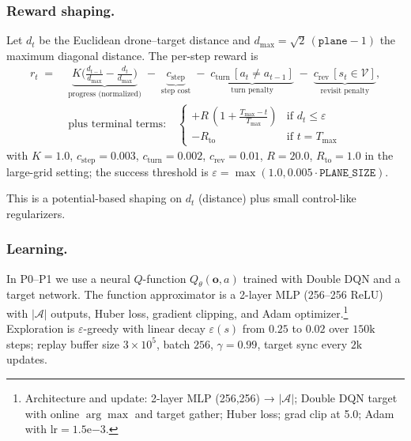         \subsubsection{Reward shaping.}
            Let $d_t$ be the Euclidean drone–target distance and $d_{\max}=\sqrt{2}\,(\texttt{plane}-1)$ the maximum diagonal distance. The per-step reward is
            \begin{align}
                r_t \;=\; &\underbrace{K \big(\tfrac{d_{t-1}}{d_{\max}}-\tfrac{d_t}{d_{\max}}\big)}_{\text{progress (normalized)}} \;-\; \underbrace{c_{\mathrm{step}}}_{\text{step cost}}
                \;-\; \underbrace{c_{\mathrm{turn}}\,[a_t\neq a_{t-1}]}_{\text{turn penalty}}
                \;-\; \underbrace{c_{\mathrm{rev}}\,[s_t\in\mathcal{V}]}_{\text{revisit penalty}}, \label{eq:reward}\\
                &\text{plus terminal terms:}\quad 
                \begin{cases}
                +R\,(1+\tfrac{T_{\max}-t}{T_{\max}}) & \text{if } d_t\le \varepsilon \\
                - R_{\mathrm{to}} & \text{if } t\!=\!T_{\max}
                \end{cases}\nonumber
            \end{align}
            with $K=1.0$, $c_{\mathrm{step}}{=}0.003$, $c_{\mathrm{turn}}{=}0.002$, $c_{\mathrm{rev}}{=}0.01$, $R{=}20.0$, $R_{\mathrm{to}}{=}1.0$ in the large-grid setting; the success threshold is $\varepsilon=\max(1.0,0.005\cdot \texttt{PLANE\_SIZE})$.%
            
            This is a potential-based shaping on $d_t$ (distance) plus small control-like regularizers.

        \subsubsection{Learning.}
            In P0--P1 we use a neural $Q$-function $Q_\theta(\mathbf{o},a)$ trained with Double DQN and a target network. The function approximator is a 2-layer MLP (256–256 ReLU) with $|\mathcal{A}|$ outputs, Huber loss, gradient clipping, and Adam optimizer.\footnote{Architecture and update: 2-layer MLP (256,256) → $|\mathcal{A}|$; Double DQN target with online $\arg\max$ and target gather; Huber loss; grad clip at 5.0; Adam with $\mathrm{lr}=1.5\mathrm{e}{-3}$.}  
            Exploration is $\varepsilon$-greedy with linear decay $\varepsilon(s)$ from $0.25$ to $0.02$ over $150\text{k}$ steps; replay buffer size $3\!\times\!10^5$, batch $256$, $\gamma=0.99$, target sync every $2\text{k}$ updates.


